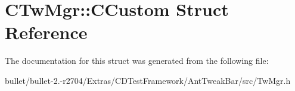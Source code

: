 \hypertarget{struct_c_tw_mgr_1_1_c_custom}{\section{C\+Tw\+Mgr\+:\+:C\+Custom Struct Reference}
\label{struct_c_tw_mgr_1_1_c_custom}
}


The documentation for this struct was generated from the following file\+:\begin{DoxyCompactItemize}
\item 
bullet/bullet-\/2.-\/r2704/\+Extras/\+C\+D\+Test\+Framework/\+Ant\+Tweak\+Bar/src/Tw\+Mgr.\+h\end{DoxyCompactItemize}
